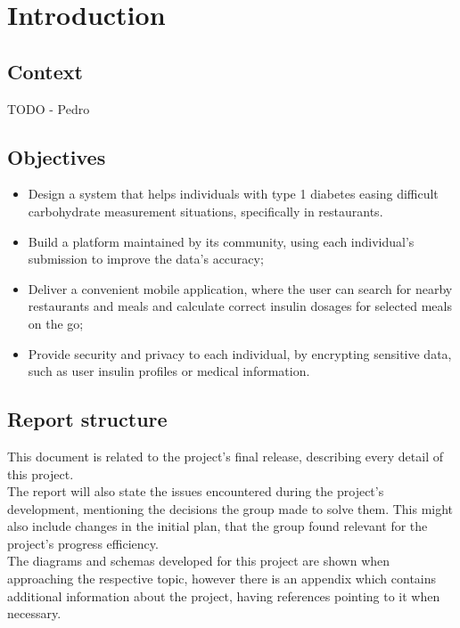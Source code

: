 %
%

\chapter{Introduction}

\section{Context}

TODO - Pedro\\

\section{Objectives}

\begin{itemize}
    \item Design a system that helps individuals with type 1 diabetes easing difficult carbohydrate measurement situations, specifically in restaurants.
    \item Build a platform maintained by its community, using each individual's submission to improve the data's accuracy;
    \item Deliver a convenient mobile application, where the user can search for nearby restaurants and meals and calculate correct insulin dosages
    for selected meals on the go;
    \item Provide security and privacy to each individual, by encrypting sensitive data, such as user insulin profiles or medical information.
\end{itemize}

\section{Report structure}

This document is related to the project's final release, describing every detail of this project.\\

The report will also state the issues encountered during the project's development, mentioning the 
decisions the group made to solve them. This might also include changes in the
initial plan, that the group found relevant for the project's progress efficiency.\\

The diagrams and schemas developed for this project are shown when approaching the respective topic,
however there is an appendix which contains additional information about the project, having 
references pointing to it when necessary.
